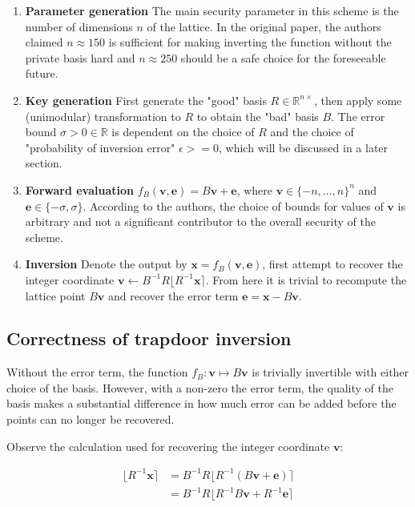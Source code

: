 \documentclass[letterpaper,12pt]{article}
\begin{document}
\begin{enumerate}
    \item \textbf{Parameter generation} The main security parameter in this scheme is the number of dimensions $n$ of the lattice. In the original paper, the authors claimed $n \approx 150$ is sufficient for making inverting the function without the private basis hard and $n \approx 250$ should be a safe choice for the foreseeable future.
    \item \textbf{Key generation} First generate the "good" basis $R \in \mathbb{R}^{n \times }$, then apply some (unimodular) transformation to $R$ to obtain the "bad" basis $B$. The error bound $\sigma > 0 \in \mathbb{R}$ is dependent on the choice of $R$ and the choice of "probability of inversion error" $\epsilon >= 0$, which will be discussed in a later section.
    \item \textbf{Forward evaluation} $f_{B}(\mathbf{v}, \mathbf{e}) = B\mathbf{v} + \mathbf{e}$, where $\mathbf{v} \in \{-n, \ldots, n\}^n$ and $\mathbf{e} \in \{-\sigma, \sigma\}$. According to the authors, the choice of bounds for values of $\mathbf{v}$ is arbitrary and not a significant contributor to the overall security of the scheme.
    \item \textbf{Inversion} Denote the output by $\mathbf{x} = f_{B}(\mathbf{v}, \mathbf{e})$, first attempt to recover the integer coordinate $\mathbf{v} \leftarrow B^{-1}R\lfloor R^{-1}\mathbf{x} \rceil$. From here it is trivial to recompute the lattice point $B\mathbf{v}$ and recover the error term $\mathbf{e} = \mathbf{x} - B\mathbf{v}$.
\end{enumerate}

\subsection{Correctness of trapdoor inversion}
Without the error term, the function $f_B: \mathbf{v} \mapsto B\mathbf{v}$ is trivially invertible with either choice of the basis. However, with a non-zero the error term, the quality of the basis makes a substantial difference in how much error can be added before the points can no longer be recovered.

Observe the calculation used for recovering the integer coordinate $\mathbf{v}$:

$$
\begin{aligned}
\lfloor R^{-1}\mathbf{x} \rceil &= B^{-1}R\lfloor R^{-1}(B\mathbf{v} + \mathbf{e})\rceil \\
&= B^{-1}R\lfloor R^{-1}B\mathbf{v} + R^{-1}\mathbf{e}\rceil
\end{aligned}
$$
\end{document}
